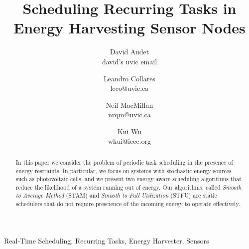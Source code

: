 \documentclass[10pt,conference]{IEEEtran}
\begin{document}
\title{Scheduling Recurring Tasks in Energy Harvesting Sensor Nodes}
\author{David Audet\\david's uvic email \and Leandro Collares\\leco@uvic.ca \and Neil MacMillan\\nrqm@uvic.ca \and Kui Wu\\wkui@ieee.org}

\maketitle


\begin{abstract}
In this paper we consider the problem of periodic task scheduling in the presence of energy restraints.  In particular, we focus on systems with stochastic energy sources such as photovoltaic cells, and we present two energy-aware scheduling algorithms that reduce the likelihood of a system running out of energy.  Our algorithms, called \emph{Smooth to Average Method} (STAM) and \emph{Smooth to Full Utilization} (STFU) are static schedulers that do not require prescience of the incoming energy to operate effectively.
\end{abstract}

\begin{IEEEkeywords} Real-Time Scheduling, Recurring Tasks, Energy Harvester, Sensors
\end{IEEEkeywords}

























\end{document}
